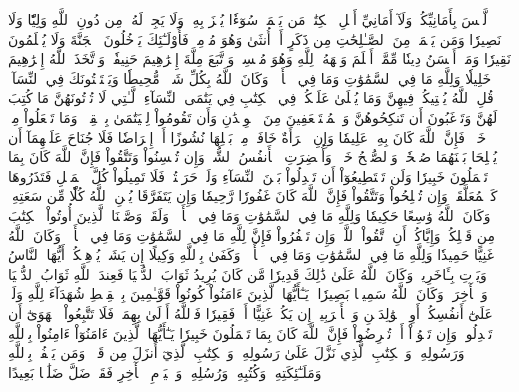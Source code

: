 لَّيۡسَ بِأَمَانِيِّكُمۡ وَلَآ أَمَانِيِّ أَهۡلِ ٱلۡكِتَٰبِۗ مَن يَعۡمَلۡ سُوٓءٗا يُجۡزَ بِهِۦ وَلَا يَجِدۡ لَهُۥ مِن دُونِ ٱللَّهِ وَلِيّٗا وَلَا نَصِيرٗا
وَمَن يَعۡمَلۡ مِنَ ٱلصَّـٰلِحَٰتِ مِن ذَكَرٍ أَوۡ أُنثَىٰ وَهُوَ مُؤۡمِنٞ فَأُوْلَـٰٓئِكَ يَدۡخُلُونَ ٱلۡجَنَّةَ وَلَا يُظۡلَمُونَ نَقِيرٗا
وَمَنۡ أَحۡسَنُ دِينٗا مِّمَّنۡ أَسۡلَمَ وَجۡهَهُۥ لِلَّهِ وَهُوَ مُحۡسِنٞ وَٱتَّبَعَ مِلَّةَ إِبۡرَٰهِيمَ حَنِيفٗاۗ وَٱتَّخَذَ ٱللَّهُ إِبۡرَٰهِيمَ خَلِيلٗا
وَلِلَّهِ مَا فِي ٱلسَّمَٰوَٰتِ وَمَا فِي ٱلۡأَرۡضِۚ وَكَانَ ٱللَّهُ بِكُلِّ شَيۡءٖ مُّحِيطٗا
وَيَسۡتَفۡتُونَكَ فِي ٱلنِّسَآءِۖ قُلِ ٱللَّهُ يُفۡتِيكُمۡ فِيهِنَّ وَمَا يُتۡلَىٰ عَلَيۡكُمۡ فِي ٱلۡكِتَٰبِ فِي يَتَٰمَى ٱلنِّسَآءِ ٱلَّـٰتِي لَا تُؤۡتُونَهُنَّ مَا كُتِبَ لَهُنَّ وَتَرۡغَبُونَ أَن تَنكِحُوهُنَّ وَٱلۡمُسۡتَضۡعَفِينَ مِنَ ٱلۡوِلۡدَٰنِ وَأَن تَقُومُواْ لِلۡيَتَٰمَىٰ بِٱلۡقِسۡطِۚ وَمَا تَفۡعَلُواْ مِنۡ خَيۡرٖ فَإِنَّ ٱللَّهَ كَانَ بِهِۦ عَلِيمٗا
وَإِنِ ٱمۡرَأَةٌ خَافَتۡ مِنۢ بَعۡلِهَا نُشُوزًا أَوۡ إِعۡرَاضٗا فَلَا جُنَاحَ عَلَيۡهِمَآ أَن يُصۡلِحَا بَيۡنَهُمَا صُلۡحٗاۚ وَٱلصُّلۡحُ خَيۡرٞۗ وَأُحۡضِرَتِ ٱلۡأَنفُسُ ٱلشُّحَّۚ وَإِن تُحۡسِنُواْ وَتَتَّقُواْ فَإِنَّ ٱللَّهَ كَانَ بِمَا تَعۡمَلُونَ خَبِيرٗا
وَلَن تَسۡتَطِيعُوٓاْ أَن تَعۡدِلُواْ بَيۡنَ ٱلنِّسَآءِ وَلَوۡ حَرَصۡتُمۡۖ فَلَا تَمِيلُواْ كُلَّ ٱلۡمَيۡلِ فَتَذَرُوهَا كَٱلۡمُعَلَّقَةِۚ وَإِن تُصۡلِحُواْ وَتَتَّقُواْ فَإِنَّ ٱللَّهَ كَانَ غَفُورٗا رَّحِيمٗا
وَإِن يَتَفَرَّقَا يُغۡنِ ٱللَّهُ كُلّٗا مِّن سَعَتِهِۦۚ وَكَانَ ٱللَّهُ وَٰسِعًا حَكِيمٗا
وَلِلَّهِ مَا فِي ٱلسَّمَٰوَٰتِ وَمَا فِي ٱلۡأَرۡضِۗ وَلَقَدۡ وَصَّيۡنَا ٱلَّذِينَ أُوتُواْ ٱلۡكِتَٰبَ مِن قَبۡلِكُمۡ وَإِيَّاكُمۡ أَنِ ٱتَّقُواْ ٱللَّهَۚ وَإِن تَكۡفُرُواْ فَإِنَّ لِلَّهِ مَا فِي ٱلسَّمَٰوَٰتِ وَمَا فِي ٱلۡأَرۡضِۚ وَكَانَ ٱللَّهُ غَنِيًّا حَمِيدٗا
وَلِلَّهِ مَا فِي ٱلسَّمَٰوَٰتِ وَمَا فِي ٱلۡأَرۡضِۚ وَكَفَىٰ بِٱللَّهِ وَكِيلًا
إِن يَشَأۡ يُذۡهِبۡكُمۡ أَيُّهَا ٱلنَّاسُ وَيَأۡتِ بِـَٔاخَرِينَۚ وَكَانَ ٱللَّهُ عَلَىٰ ذَٰلِكَ قَدِيرٗا
مَّن كَانَ يُرِيدُ ثَوَابَ ٱلدُّنۡيَا فَعِندَ ٱللَّهِ ثَوَابُ ٱلدُّنۡيَا وَٱلۡأٓخِرَةِۚ وَكَانَ ٱللَّهُ سَمِيعَۢا بَصِيرٗا
۞يَـٰٓأَيُّهَا ٱلَّذِينَ ءَامَنُواْ كُونُواْ قَوَّـٰمِينَ بِٱلۡقِسۡطِ شُهَدَآءَ لِلَّهِ وَلَوۡ عَلَىٰٓ أَنفُسِكُمۡ أَوِ ٱلۡوَٰلِدَيۡنِ وَٱلۡأَقۡرَبِينَۚ إِن يَكُنۡ غَنِيًّا أَوۡ فَقِيرٗا فَٱللَّهُ أَوۡلَىٰ بِهِمَاۖ فَلَا تَتَّبِعُواْ ٱلۡهَوَىٰٓ أَن تَعۡدِلُواْۚ وَإِن تَلۡوُۥٓاْ أَوۡ تُعۡرِضُواْ فَإِنَّ ٱللَّهَ كَانَ بِمَا تَعۡمَلُونَ خَبِيرٗا
يَـٰٓأَيُّهَا ٱلَّذِينَ ءَامَنُوٓاْ ءَامِنُواْ بِٱللَّهِ وَرَسُولِهِۦ وَٱلۡكِتَٰبِ ٱلَّذِي نَزَّلَ عَلَىٰ رَسُولِهِۦ وَٱلۡكِتَٰبِ ٱلَّذِيٓ أَنزَلَ مِن قَبۡلُۚ وَمَن يَكۡفُرۡ بِٱللَّهِ وَمَلَـٰٓئِكَتِهِۦ وَكُتُبِهِۦ وَرُسُلِهِۦ وَٱلۡيَوۡمِ ٱلۡأٓخِرِ فَقَدۡ ضَلَّ ضَلَٰلَۢا بَعِيدًا
